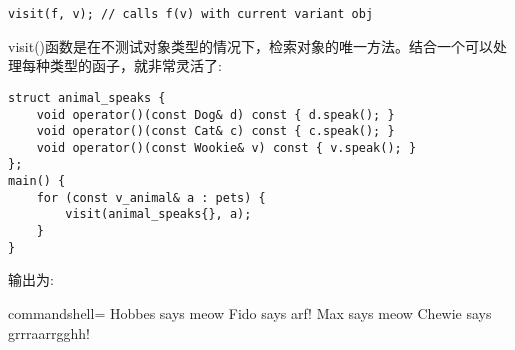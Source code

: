 \begin{lstlisting}[style=styleCXX]
visit(f, v); // calls f(v) with current variant obj
\end{lstlisting}

visit()函数是在不测试对象类型的情况下，检索对象的唯一方法。结合一个可以处理每种类型的函子，就非常灵活了:

\begin{lstlisting}[style=styleCXX]
struct animal_speaks {
	void operator()(const Dog& d) const { d.speak(); }
	void operator()(const Cat& c) const { c.speak(); }
	void operator()(const Wookie& v) const { v.speak(); }
};
main() {
	for (const v_animal& a : pets) {
		visit(animal_speaks{}, a);
	}
}
\end{lstlisting}

输出为:

\begin{tcblisting}{commandshell={}}
Hobbes says meow
Fido says arf!
Max says meow
Chewie says grrraarrgghh!
\end{tcblisting}


